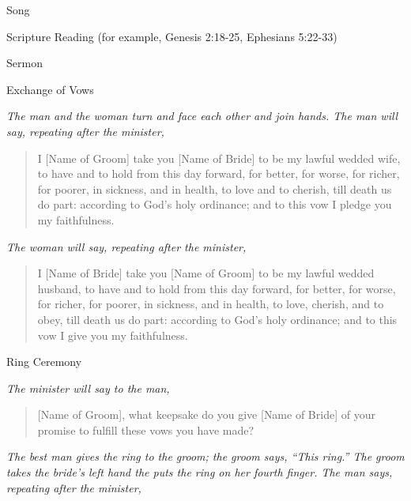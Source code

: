 \documentclass[
]{book}
\begin{document}
Song

Scripture Reading (for example, Genesis 2:18-25, Ephesians 5:22-33)

Sermon

Exchange of Vows

\begin{center}
\emph{The man and the woman turn and face each other and join hands. The man will say, repeating after the minister,}

\end{center}

\begin{quote}
I {[}Name of Groom{]} take you {[}Name of Bride{]} to be my lawful wedded wife, to have and to hold from this day forward, for better, for worse, for richer, for poorer, in sickness, and in health, to love and to cherish, till death us do part: according to God's holy ordinance; and to this vow I pledge you my faithfulness.
\end{quote}

\begin{center}
\emph{The woman will say, repeating after the minister,}

\end{center}

\begin{quote}
I {[}Name of Bride{]} take you {[}Name of Groom{]} to be my lawful wedded husband, to have and to hold from this day forward, for better, for worse, for richer, for poorer, in sickness, and in health, to love, cherish, and to obey, till death us do part: according to God's holy ordinance; and to this vow I give you my faithfulness.
\end{quote}

Ring Ceremony

\begin{center}
\emph{The minister will say to the man,}

\end{center}

\begin{quote}
{[}Name of Groom{]}, what keepsake do you give {[}Name of Bride{]} of your promise to fulfill these vows you have made?
\end{quote}

\begin{center}
\emph{The best man gives the ring to the groom; the groom says, ``This ring.'' The groom takes the bride's left hand the puts the ring on her fourth finger. The man says, repeating after the minister,}

\end{center}
\end{document}
